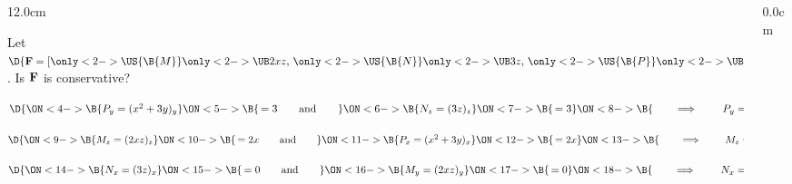\begin{frame}
\begin{columns}\begin{column}{12.0cm}

\vspace{0.1cm}

\scriptsize

\EX Let $\D{{\bf F} = [
\only<2->{\US{\B{ M }}}{\only<2->{\UB}{ 2xz }},\,
\only<2->{\US{\B{ N }}}{\only<2->{\UB}{ 3z }},\,
\only<2->{\US{\B{ P }}}{\only<2->{\UB}{ x^2+3y }}]}$. \quad Is ${\bf F}$ is conservative?

\vspace{0.2cm}


\vspace{0.5cm}

$\D{
\ON<4->{\B{P_y = (x^2+3y)_y }}
\ON<5->{\B{\,= 3
\qquad \text{and} \qquad }}
\ON<6->{\B{N_z = (3z)_z}}
\ON<7->{\B{\, = 3}}
\ON<8->{\B{\qquad \implies \qquad P_y=N_z \,\, \checkmark}}
}$

\vspace{0.5cm}

$\D{
\ON<9->{\B{M_z = (2xz)_z }}
\ON<10->{\B{\,= 2x
\qquad \text{and} \qquad }}
\ON<11->{\B{P_x = (x^2+3y)_x }}
\ON<12->{\B{\,= 2x }}
\ON<13->{\B{\qquad \implies \qquad M_z=P_x \,\, \checkmark}}
}$

\vspace{0.5cm}

$\D{
\ON<14->{\B{N_x = (3z)_x }}
\ON<15->{\B{\,= 0
\qquad \text{and} \qquad }}
\ON<16->{\B{M_y = (2xz)_y }}
\ON<17->{\B{\,= 0 }}
\ON<18->{\B{\qquad \implies \qquad N_x=M_y \,\, \checkmark}}
}$

\vspace{0.5cm}


\vspace{4.6cm}

\end{column}\begin{column}{0.0cm}\end{column}\end{columns}
\end{frame}

